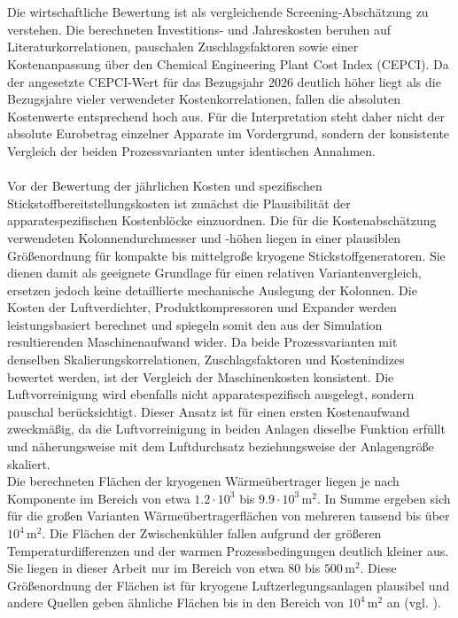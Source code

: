 \\
\\
Die wirtschaftliche Bewertung ist als vergleichende Screening-Abschätzung zu verstehen. Die berechneten Investitions- und Jahreskosten beruhen auf Literaturkorrelationen, pauschalen Zuschlagsfaktoren sowie einer Kostenanpassung über den Chemical Engineering Plant Cost Index (CEPCI). Da der angesetzte CEPCI-Wert für das Bezugsjahr 2026 deutlich höher liegt als die Bezugsjahre vieler verwendeter Kostenkorrelationen, fallen die absoluten Kostenwerte entsprechend hoch aus. Für die Interpretation steht daher nicht der absolute Eurobetrag einzelner Apparate im Vordergrund, sondern der konsistente Vergleich der beiden Prozessvarianten unter identischen Annahmen.\\
\\
Vor der Bewertung der jährlichen Kosten und spezifischen Stickstoffbereitstellungskosten ist zunächst die Plausibilität der apparatespezifischen Kostenblöcke einzuordnen. 
Die für die Kostenabschätzung verwendeten Kolonnendurchmesser und -höhen liegen in einer plausiblen Größenordnung für kompakte bis mittelgroße kryogene Stickstoffgeneratoren. Sie dienen damit als geeignete Grundlage für einen relativen Variantenvergleich, ersetzen jedoch keine detaillierte mechanische Auslegung der Kolonnen. Die Kosten der Luftverdichter, Produktkompressoren und Expander werden leistungsbasiert berechnet und spiegeln somit den aus der Simulation resultierenden Maschinenaufwand wider. Da beide Prozessvarianten mit denselben Skalierungskorrelationen, Zuschlagsfaktoren und Kostenindizes bewertet werden, ist der Vergleich der Maschinenkosten konsistent. Die Luftvorreinigung wird ebenfalls nicht apparatespezifisch ausgelegt, sondern pauschal berücksichtigt. Dieser Ansatz ist für einen ersten Kostenaufwand zweckmäßig, da die Luftvorreinigung in beiden Anlagen dieselbe Funktion erfüllt und näherungsweise mit dem Luftdurchsatz beziehungsweise der Anlagengröße skaliert. \\
Die berechneten Flächen der kryogenen Wärmeübertrager liegen je nach Komponente im Bereich von etwa \(1.2\cdot10^3\) bis \(9.9\cdot10^3\,\mathrm{m^2}\). In Summe ergeben sich für die großen Varianten Wärmeübertragerflächen von mehreren tausend bis über \(10^4\,\mathrm{m^2}\). Die Flächen der Zwischenkühler fallen aufgrund der größeren Temperaturdifferenzen und der warmen Prozessbedingungen deutlich kleiner aus. Sie liegen in dieser Arbeit nur im Bereich von etwa \(80\) bis \(500\,\mathrm{m^2}\). Diese Größenordnung der Flächen ist für kryogene Luftzerlegungsanlagen plausibel und andere Quellen geben ähnliche Flächen bis in den Bereich von \(10^4\,\mathrm{m^2}\) an (vgl. \cite{tesch_exergy-based_nodate}). 







